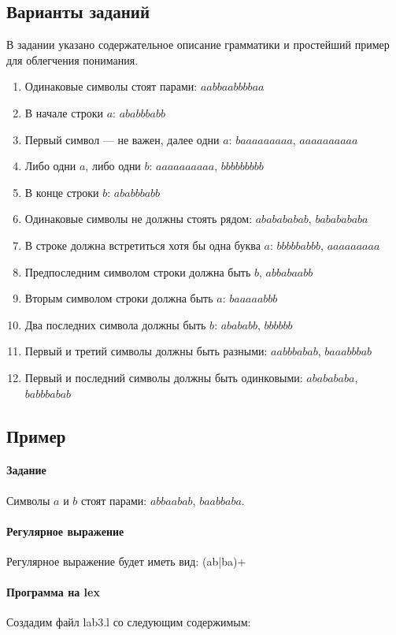 \documentclass[a4paper,12pt]{article}
\begin{document}
\subsection{Варианты заданий}
В задании указано содержательное описание грамматики и простейший пример для облегчения понимания.
\begin{enumerate}
	\item Одинаковые символы стоят парами: $aabbaabbbbaa$
	\item В начале строки $a$: $ababbbabb$
	\item Первый символ — не важен, далее одни $a$: $baaaaaaaaa$, $aaaaaaaaaa$
	\item Либо одни $a$, либо одни $b$: $aaaaaaaaaa$, $bbbbbbbbb$
	\item В конце строки $b$: $ababbbabb$
	\item Одинаковые символы не должны стоять рядом: $ababababab$, $bababababa$
	\item В строке должна встретиться хотя бы одна буква $a$: $bbbbbabbb$, $aaaaaaaaa$
	\item Предпоследним символом строки должна быть $b$, $abbabaabb$
	\item Вторым символом строки должна быть $a$: $baaaaabbb$
	\item Два последних символа должны быть $b$: $abababb$, $bbbbbb$
	\item Первый и третий символы должны быть разными: $aabbbabab$, $baaabbbab$
	\item Первый и последний символы должны быть одинковыми: $ababababa$, $babbbabab$
\end{enumerate}

\subsection{Пример}
\paragraph{Задание}
Символы $a$ и $b$ стоят парами: $abbaabab$, $baabbaba$.

\paragraph{Регулярное выражение}
Регулярное выражение будет иметь вид: (ab|ba)+

\paragraph{Программа на lex}
Создадим файл lab3.l со следующим содержимым:
\end{document}
